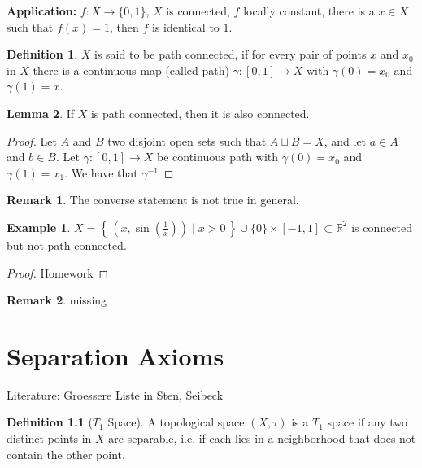\documentclass[a4paper]{book}
\theoremstyle{definition}
\newtheorem{definition}{Definition}[]
\newtheorem{example}{Example}[definition]
\newtheorem{lemma}[definition]{Lemma}
\newtheorem*{remark}{Remark}
\newcommand{\makeset}[2]{\left\{\, #1 \mid #2 \,\right\}}
\begin{document}
    \textbf{Application:} \(f: X \longrightarrow \{0, 1\}\), \(X\) is connected, \(f\) locally constant, there is a \(x \in X\) such that \(f(x) = 1\), then \(f\) is identical to \(1\).

    \begin{defbox}
        \begin{definition}
            \(X\) is said to be {\color{maththen}path connected}, if for every pair of points \(x\) and \(x_0\) in \(X\) there is a continuous map (called path) \(\gamma: [0, 1] \longrightarrow X\) with \(\gamma(0) = x_0\) and \(\gamma(1) = x\).
        \end{definition}
    \end{defbox}

    \begin{lemma}
        If \(X\) is path connected, then it is also connected.
    \end{lemma}
    \begin{proof}
        Let \(A\) and \(B\) two disjoint open sets such that \(A \sqcup B = X\), and let \(a \in A\) and \(b \in B\). Let \(\gamma: [0, 1] \longrightarrow X\) be continuous path with \(\gamma(0) = x_0\) and \(\gamma(1) = x_1\). We have that \(\gamma^{-1}\)
    \end{proof}

    \begin{remark}
        The converse statement is not true in general.
    \end{remark}

    \begin{example}
        \(X = \makeset{(x, \sin(\frac{1}{x}))}{x > 0} \cup \{0\} \times [-1, 1] \subset \mathbb{R}^2\) is connected but not path connected.
    \end{example}
    \begin{proof}
        Homework
    \end{proof}
    \begin{remark}
        missing
    \end{remark}

\chapter{Separation Axioms}
Literature: Groessere Liste in Sten, Seibeck

\begin{defbox}
    \begin{definition}[\(T_1\) Space]
        A {\color{mathobj}topological space} \((X, \tau)\) is a \(T_1\) space if any two distinct points in \(X\) are separable, i.e. if each lies in a neighborhood that does not contain the other point.
    \end{definition}
\end{defbox}
\end{document}
